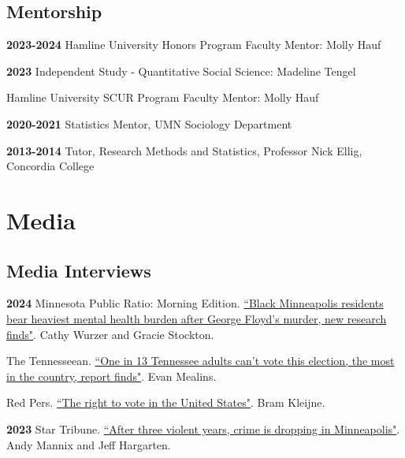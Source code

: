 \documentclass[letterpaper]{article}
\newenvironment{publist}{%
  \begin{list}{}{%
    \setlength{\leftmargin}{0cm}   %
    \setlength{\labelwidth}{2cm}     %
    \setlength{\labelsep}{0.5cm}     %
  }%
}{%
  \end{list}%
}
\begin{document}
\subsection*{Mentorship}

\begin{publist}

\item[\textbf{2023-2024}] Hamline University Honors Program Faculty Mentor: Molly Hauf
\item[\textbf{2023}] Independent Study - Quantitative Social Science: Madeline Tengel 
\item Hamline University SCUR Program Faculty Mentor: Molly Hauf
\item[\textbf{2020-2021}] Statistics Mentor, UMN Sociology Department
\item[\textbf{2013-2014}] Tutor, Research Methods and Statistics, Professor Nick Ellig, Concordia College

\end{publist}

\section*{\textbf{Media}}

\subsection*{Media Interviews}
\begin{publist} 

\item[\textbf{2024}] Minnesota Public Ratio: Morning Edition. \href{https://www.mprnews.org/story/2024/09/19/black-minneapolis-residents-bear-heaviest-mental-health-burden-after-george-floyds-murder}{``Black Minneapolis residents bear heaviest mental health burden after George Floyd’s murder, new research finds"}. Cathy Wurzer and Gracie Stockton.  

\item The Tennesseean. \href{https://www.tennessean.com/story/news/2024/10/10/tn-has-highest-felony-disenfranchisement-rate-in-nation-report-finds/75597410007/}{``One in 13 Tennessee adults can't vote this election, the most in the country, report finds"}. Evan Mealins. 

\item Red Pers. \href{https://redpers.nl/}{``The right to vote in the United States"}. Bram Kleijne.

\item[\textbf{2023}] Star Tribune. \href{https://www.startribune.com/after-three-most-violent-years-minneapolis-saw-drop-in-crime-summer-but-were-not-back-to-normal-yet/600301635/}{``After three violent years, crime is dropping in Minneapolis"}. Andy Mannix and Jeff Hargarten.  

\end{publist}
\end{document}
